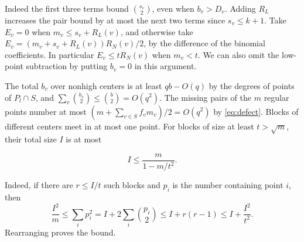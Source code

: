 \documentclass[11pt,reqno]{amsart}
\theoremstyle{definition}
\theoremstyle{remark}
\numberwithin{equation}{section}
\begin{document}
Indeed the first three terms bound \(\binom{s_v}2\), even when \(b_v>D_v\). Adding \(R_L\) increases the pair bound by at most the next two terms since \(s_v\le k+1\). Take \(E_v=0\) when \(m_v\le s_v+R_L(v)\), and otherwise take \(E_v=(m_v+s_v+R_L(v))R_N(v)/2\), by the difference of the binomial coefficients. In particular \(E_v\le tR_N(v)\) when \(m_v<t\). We can also omit the low-point subtraction by putting \(b_v=0\) in this argument.

The total \(b_v\) over nonhigh centers is at least \(qb-O(q)\) by the degrees of points of \(P_l\cap S\), and \(\sum_v\binom{b_v}2\le\binom b2=O(q^2)\). The missing pairs of the \(m\) regular points number at most \((m+\sum_{v\in S} f_v m_v)/2=O(q^2)\) by \eqref{eq:defect}. Blocks of different centers meet in at most one point. For blocks of size at least \(t>\sqrt m\), their total size \(I\) is at most

\begin{equation}\label{eq:large-blocks}
I\le\frac{m}{1-m/t^2}.
\end{equation}

Indeed, if there are \(r\le I/t\) such blocks and \(p_i\) is the
number containing point \(i\), then
\[
\frac{I^2}{m}\le\sum_i p_i^2
 =I+2\sum_i\binom{p_i}2\le I+r(r-1)\le I+\frac{I^2}{t^2}.
\]
Rearranging proves the bound.
\end{document}
